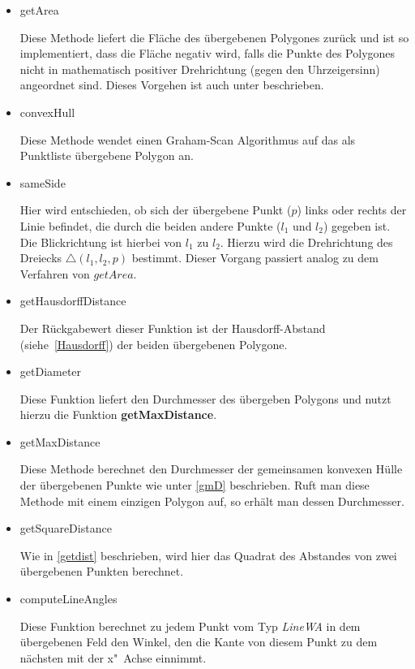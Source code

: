 \begin{itemize}

\item getArea

Diese Methode liefert die Fläche des übergebenen Polygones zurück und ist so implementiert, dass die Fläche negativ wird, falls die Punkte des Polygones nicht in mathematisch positiver Drehrichtung (gegen den Uhrzeigersinn) angeordnet sind. Dieses Vorgehen ist auch unter \cite{BW} beschrieben.

\item convexHull

Diese Methode wendet einen Graham-Scan Algorithmus auf das als Punktliste übergebene Polygon an.

\item sameSide

Hier wird entschieden, ob sich der übergebene Punkt ($p$) links oder rechts der Linie befindet, die durch die beiden andere Punkte  ($l_1$ und $l_2$) gegeben ist. Die Blickrichtung ist hierbei von $l_1$ zu $l_2$. Hierzu wird die Drehrichtung des Dreiecks $\bigtriangleup(l_1,l_2,p)$ bestimmt. Dieser Vorgang passiert analog zu  dem Verfahren von $getArea$.

\item getHausdorffDistance

Der Rückgabewert dieser Funktion ist der Hausdorff-Abstand (siehe~\vref{Hausdorff}) der beiden übergebenen Polygone. 

\item getDiameter

Diese Funktion liefert den Durchmesser des übergeben Polygons und nutzt hierzu die Funktion \textbf{getMaxDistance}.

\item getMaxDistance

Diese Methode berechnet den Durchmesser der gemeinsamen konvexen Hülle der übergebenen Punkte wie unter \vref{gmD} beschrieben. Ruft man diese Methode mit einem einzigen Polygon auf, so erhält man dessen Durchmesser.

\item getSquareDistance

Wie in \vref{getdist} beschrieben, wird hier das Quadrat des Abstandes von zwei übergebenen Punkten berechnet.

\item computeLineAngles

Diese Funktion berechnet zu jedem Punkt vom Typ \textit{LineWA} in dem übergebenen Feld den Winkel, den die Kante von diesem Punkt zu dem nächsten  mit der x"~Achse einnimmt. 


\end{itemize}
